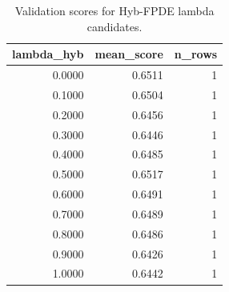 \begin{table}[t]
\caption{Validation scores for Hyb-FPDE lambda candidates.}
\label{tab:lambda_distribution_computed}
\centering
\begin{tabular}{rrr}
\toprule
lambda\_hyb & mean\_score & n\_rows \\
\midrule
0.0000 & 0.6511 & 1 \\
0.1000 & 0.6504 & 1 \\
0.2000 & 0.6456 & 1 \\
0.3000 & 0.6446 & 1 \\
0.4000 & 0.6485 & 1 \\
0.5000 & 0.6517 & 1 \\
0.6000 & 0.6491 & 1 \\
0.7000 & 0.6489 & 1 \\
0.8000 & 0.6486 & 1 \\
0.9000 & 0.6426 & 1 \\
1.0000 & 0.6442 & 1 \\
\bottomrule
\end{tabular}

\end{table}
